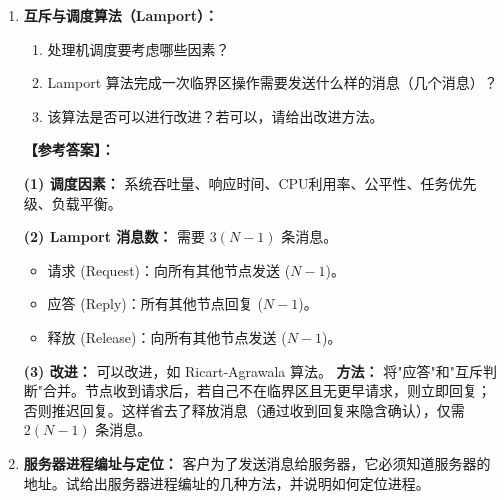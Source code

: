 \documentclass[a4paper,12pt]{article}
\newcommand{\answer}[1]{\par\vspace{0.5em}\hspace{2em}\textbf{【参考答案】：}\\{\color{blue}#1}\par\vspace{1em}}
\begin{document}
\begin{enumerate}[label=\arabic*.]
{    \textbf{(2) 绑定方法：}
    \begin{itemize}
        \item \textbf{集中式名字服务器（Name Server）：} 服务器启动时注册，客户机向名字服务器查询。
            \begin{itemize}
                \item \textit{优点：} 简单，易于管理。 \textit{缺点：} 存在单点故障，可能成为瓶颈。
            \end{itemize}
        \item \textbf{广播查找：} 客户机广播请求，目标服务器响应。
            \begin{itemize}
                \item \textit{优点：} 灵活，无单点故障。 \textit{缺点：} 增加网络负载。
            \end{itemize}
    \end{itemize}
    }

    \item \textbf{互斥与调度算法（Lamport）：}
    \begin{enumerate}
        \item 处理机调度要考虑哪些因素？
        \item Lamport 算法完成一次临界区操作需要发送什么样的消息（几个消息）？
        \item 该算法是否可以进行改进？若可以，请给出改进方法。
    \end{enumerate}

    \answer{
    \textbf{(1) 调度因素：} 系统吞吐量、响应时间、CPU利用率、公平性、任务优先级、负载平衡。
    
    \textbf{(2) Lamport 消息数：} 需要 $3(N-1)$ 条消息。
    \begin{itemize}
        \item 请求 (Request)：向所有其他节点发送 ($N-1$)。
        \item 应答 (Reply)：所有其他节点回复 ($N-1$)。
        \item 释放 (Release)：向所有其他节点发送 ($N-1$)。
    \end{itemize}

    \textbf{(3) 改进：} 可以改进，如 Ricart-Agrawala 算法。
    \textbf{方法：} 将"应答"和"互斥判断"合并。节点收到请求后，若自己不在临界区且无更早请求，则立即回复；否则推迟回复。这样省去了释放消息（通过收到回复来隐含确认），仅需 $2(N-1)$ 条消息。
    }

    \item \textbf{服务器进程编址与定位：}
    客户为了发送消息给服务器，它必须知道服务器的地址。试给出服务器进程编址的几种方法，并说明如何定位进程。
    

\end{enumerate}
\end{document}
